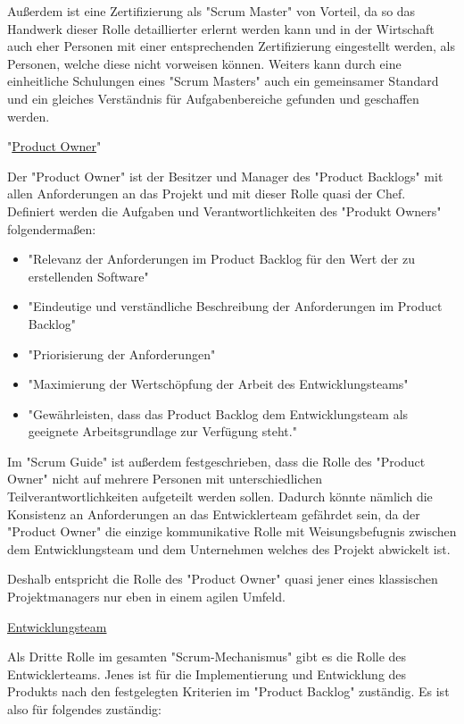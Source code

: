 Außerdem ist eine Zertifizierung als "Scrum Master" von Vorteil, da so das Handwerk dieser Rolle detaillierter erlernt werden kann und in der Wirtschaft auch eher Personen mit einer entsprechenden Zertifizierung eingestellt werden, als Personen, welche diese nicht vorweisen können. Weiters kann durch eine einheitliche Schulungen eines "Scrum Masters" auch ein gemeinsamer Standard und ein gleiches Verständnis für Aufgabenbereiche gefunden und geschaffen werden. \cite{ScrumMaster}

"\underline{Product Owner}"

Der "Product Owner" ist der Besitzer und Manager des "Product Backlogs" mit allen Anforderungen an das Projekt und mit dieser Rolle quasi der Chef. Definiert werden die Aufgaben und Verantwortlichkeiten des "Produkt Owners" folgendermaßen:

\begin{itemize}
    \item "Relevanz der Anforderungen im Product Backlog für den Wert der zu erstellenden Software" \cite{ProductOwner}
    \item "Eindeutige und verständliche Beschreibung der Anforderungen im Product Backlog" \cite{ProductOwner}
    \item "Priorisierung der Anforderungen" \cite{ProductOwner}
    \item "Maximierung der Wertschöpfung der Arbeit des Entwicklungsteams" \cite{ProductOwner}
    \item "Gewährleisten, dass das Product Backlog dem Entwicklungsteam als geeignete Arbeitsgrundlage zur Verfügung steht." \cite{ProductOwner}
\end{itemize}

Im "Scrum Guide" ist außerdem festgeschrieben, dass die Rolle des "Product Owner" nicht auf mehrere Personen mit unterschiedlichen Teilverantwortlichkeiten aufgeteilt werden sollen. Dadurch könnte nämlich die Konsistenz an Anforderungen an das Entwicklerteam gefährdet sein, da der "Product Owner" die einzige kommunikative Rolle mit Weisungsbefugnis zwischen dem Entwicklungsteam und dem Unternehmen welches des Projekt abwickelt ist.

Deshalb entspricht die Rolle des "Product Owner" quasi jener eines klassischen Projektmanagers nur eben in einem agilen Umfeld.

\underline{Entwicklungsteam}

Als Dritte Rolle im gesamten "Scrum-Mechanismus" gibt es die Rolle des Entwicklerteams. Jenes ist für die Implementierung und Entwicklung des Produkts nach den festgelegten Kriterien im "Product Backlog" zuständig. Es ist also für folgendes zuständig:

